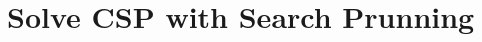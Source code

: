 \documentclass[../main.tex]{subfiles}
\begin{document}






\section{Solve CSP with Search Prunning}
\label{sec_sudoku}
\end{document}
